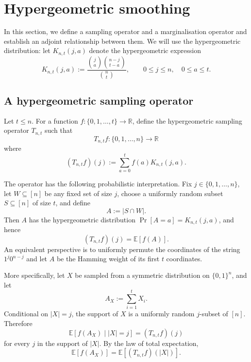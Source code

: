 \documentclass[manuscript,nonacm]{acmart}
\begin{document}
\section{Hypergeometric smoothing}
\label{s:hypersmooth}
In this section, we define a sampling operator and a marginalisation operator and establish an adjoint relationship between them. We will use the hypergeometric distribution: let \(K_{n,t}(j,a)\) denote the hypergeometric expression
\[
    K_{n,t}(j,a)
    :=
    \frac{\binom ja\binom{n-j}{t-a}}{\binom nt},
    \qquad
    0\le j\le n,\quad 0\le a\le t.
\]



\subsection{A hypergeometric sampling operator}
Let $t\leq n$. For a function $f:\{0,1,\dots,t\}\to\mathbb R$,
define the hypergeometric sampling operator $T_{n,t}$ such that
\[
    T_{n,t}f:\{0,1,\dots,n\}\to\mathbb R
\]
where
\begin{equation}
\label{eq:hypergeometric-operator}
    (T_{n,t}f)(j)
    :=
    \sum_{a=0}^t
    f(a)K_{n,t}(j,a).
\end{equation}

The operator has the following probabilistic interpretation. Fix
\(j\in\{0,1,\dots,n\}\), let \(W\subseteq[n]\) be any fixed set of size
\(j\), choose a uniformly random subset \(S\subseteq[n]\) of size
\(t\), and define
\[
    A:=|S\cap W|.
\]
Then \(A\) has the hypergeometric distribution $\Pr[A=a]=K_{n,t}(j,a)$,
and hence
\begin{equation}
\label{eq:hypergeometric-operator-hypergeometric}
    (T_{n,t}f)(j)
    =
    \mathbb E[f(A)].
\end{equation}
An equivalent perspective is to uniformly permute the coordinates of the string
\(1^j0^{n-j}\) and let \(A\) be the Hamming weight of its first \(t\)
coordinates.

More specifically, let \(X\) be sampled from a symmetric distribution on
\(\{0,1\}^n\), and let
\[
    A_X:=\sum_{i=1}^t X_i.
\]
Conditional on \(|X|=j\), the support of \(X\) is a uniformly random
\(j\)-subset of \([n]\). Therefore
\begin{equation}
    \label{eq:hypergeometric-operator-hypergeometric}
    \mathbb E[f(A_X)\mid |X|=j]
    =
    (T_{n,t}f)(j)
\end{equation}
for every \(j\) in the support of \(|X|\). By the law of total
expectation,
\begin{equation}
\label{eq:sampling-operator-expectation}
    \mathbb E[f(A_X)]
    =
    \mathbb E\!\left[(T_{n,t}f)(|X|)\right].
\end{equation}
\end{document}
